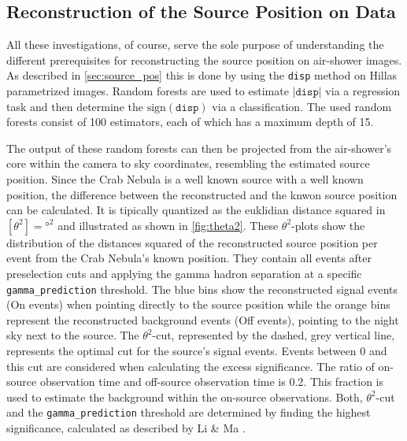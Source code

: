\subsection{Reconstruction of the Source Position on Data}

All these investigations, of course, serve the sole purpose of understanding
the different prerequisites for reconstructing the source position on
air-shower images. As described in \autoref{sec:source_pos} this is done by
using the \texttt{disp} method on Hillas parametrized images. Random forests
are used to estimate $|\texttt{disp}|$ via a regression task and then determine
the $\text{sign}(\texttt{disp})$ via a classification. The used random forests
consist of \num{100} estimators, each of which has a maximum depth of \num{15}.

The output of these random forests can then be projected from the air-shower's
core within the camera to sky coordinates, resembling the estimated source
position. Since the Crab Nebula is a well known source with a well known
position, the difference between the reconstructed and the knwon source
position can be calculated. It is tipically quantized as the euklidian distance
squared in $[\theta^2] = \si{\degree\squared}$ and illustrated as shown in
\autoref{fig:theta2}. These $\theta^2$-plots show the distribution of the
distances squared of the reconstructed source position per event from the Crab
Nebula's known position. They contain all events after preselection cuts and
applying the gamma hadron separation at a specific \texttt{gamma\_prediction}
threshold. The blue bins show the reconstructed signal events (On events) when
pointing directly to the source position while the orange bins represent the
reconstructed background events (Off events), pointing to the night sky next to
the source. The $\theta^2$-cut, represented by the dashed, grey vertical line,
represents the optimal cut for the source's signal events. Events between
\num{0} and this cut are considered when calculating the excess significance.
The ratio of on-source observation time and off-source observation time is
\num{0.2}. This fraction is used to estimate the background within the
on-source observations. Both, $\theta^2$-cut and the \texttt{gamma\_prediction}
threshold are determined by finding the highest significance, calculated as
described by Li \& Ma \cite{LiMa}.

